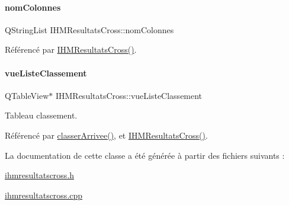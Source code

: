 \mbox{\label{class_i_h_m_resultats_cross_abfda0d5dc4b65c0525a94a74faf68ce0}} 
\paragraph{\texorpdfstring{nom\+Colonnes}{nomColonnes}}
{\footnotesize\ttfamily Q\+String\+List I\+H\+M\+Resultats\+Cross\+::nom\+Colonnes\hspace{0.3cm}{\ttfamily [private]}}



Référencé par \hyperlink{class_i_h_m_resultats_cross_a94afa0356ebc98e497dfecca3e1bb00b}{I\+H\+M\+Resultats\+Cross()}.

\mbox{\label{class_i_h_m_resultats_cross_a8f35fc63f8c3a1351658d3148daf13e0}} 
\paragraph{\texorpdfstring{vue\+Liste\+Classement}{vueListeClassement}}
{\footnotesize\ttfamily Q\+Table\+View$\ast$ I\+H\+M\+Resultats\+Cross\+::vue\+Liste\+Classement\hspace{0.3cm}{\ttfamily [private]}}



Tableau classement. 



Référencé par \hyperlink{class_i_h_m_resultats_cross_a5f4a74c4c024aaa9d39050ac176c9e37}{classer\+Arrivee()}, et \hyperlink{class_i_h_m_resultats_cross_a94afa0356ebc98e497dfecca3e1bb00b}{I\+H\+M\+Resultats\+Cross()}.



La documentation de cette classe a été générée à partir des fichiers suivants \+:\begin{DoxyCompactItemize}
\item 
\hyperlink{ihmresultatscross_8h}{ihmresultatscross.\+h}\item 
\hyperlink{ihmresultatscross_8cpp}{ihmresultatscross.\+cpp}\end{DoxyCompactItemize}
